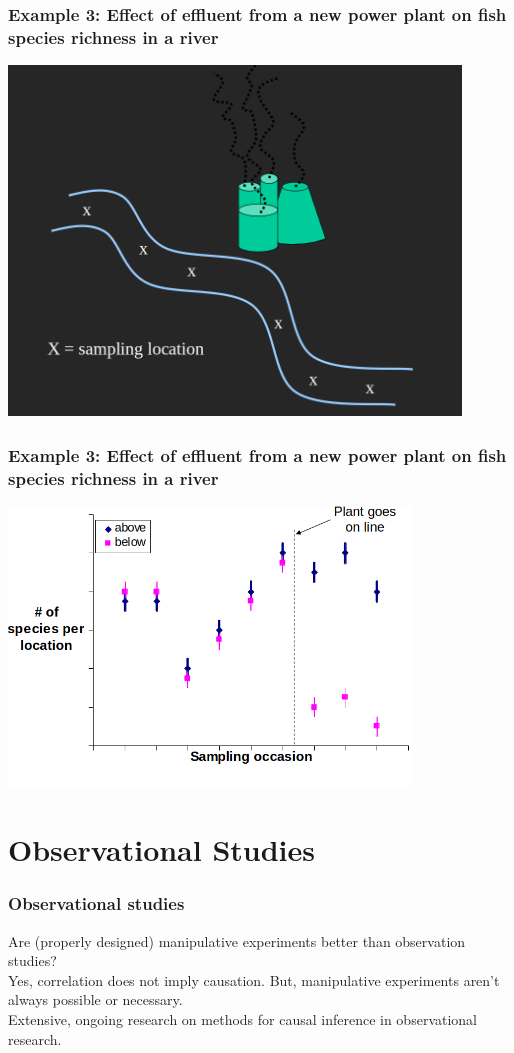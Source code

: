 \documentclass[color=usenames,dvipsnames]{beamer}\usepackage[]{graphicx}\usepackage[]{color}
\begin{document}
\begin{frame}
  \frametitle{Example 3: Effect of effluent from a new power plant on
    fish species richness in a river}
  \centering
  \includegraphics[width=0.9\textwidth]{power-plant-river} \\
\end{frame}


\begin{frame}
  \frametitle{Example 3: Effect of effluent from a new power plant on
    fish species richness in a river}
  \centering
  \includegraphics[width=0.8\textwidth]{power-plant} \\
\end{frame}


\section{Observational Studies}


\begin{frame}
  \frametitle{Observational studies}
  Are (properly designed) manipulative experiments better than
  observation studies? \\
  \vfill
  Yes, correlation does not imply causation. But, manipulative
  experiments aren't always possible or necessary. \\
  \vfill
  Extensive, ongoing research on methods for causal inference in
  observational research.
  
\end{frame}
\end{document}
